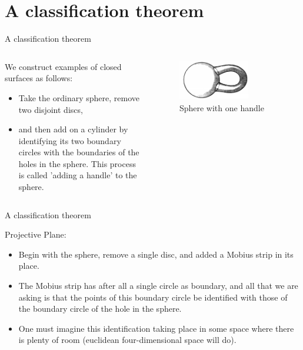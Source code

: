 \documentclass{beamer}
\begin{document}
\section{A classification theorem}

\begin{frame}{A classification theorem}
  \begin{columns}
    \begin{column}{0.6\textwidth}
      \begin{block}{}
        We construct examples of closed surfaces as follows:
        \begin{itemize}
        \item Take the ordinary sphere, remove two disjoint discs,
        \item and then add on a cylinder by identifying its two boundary circles with the boundaries of the holes in the sphere.
          This process is called 'adding a handle' to the sphere.
        \end{itemize}
      \end{block}
    \end{column}
    \begin{column}{0.4\textwidth}
      \begin{figure}
        \centering
        \includegraphics[width=0.7\textwidth]{figure_1_17.png}
        \caption{Sphere with one handle}
      \end{figure}
    \end{column}
  \end{columns}
\end{frame}

\begin{frame}{A classification theorem}
  \begin{block}{}
    Projective Plane:
    \begin{itemize}
    \item Begin with the sphere, remove a single disc, and added a Mobius strip in its place.
    \item The Mobius strip has after all a single circle as boundary, and all that we are asking is that the points of this boundary circle be identified with those of the boundary circle of the hole in the sphere.
    \item One must imagine this identification taking place in some space where there is plenty of room (euclidean four-dimensional space will do).
    \end{itemize}
  \end{block}
\end{frame}
\end{document}
